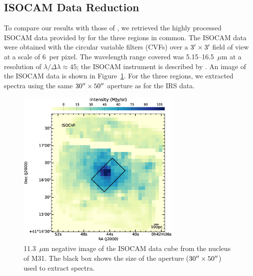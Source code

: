 \subsection{ISOCAM Data Reduction}
\label{sect:iso_data}

To compare our results with those of  \citet{1998Cesarsky}, we retrieved the highly processed ISOCAM data provided by \citet{Boulanger_F_2005}  
for the three regions in common. 
The ISOCAM data were obtained with the circular variable filters (CVFs) over a $3\hbox{$^\prime$} \times 3\hbox{$^\prime$}$ field of view at a scale of 6\arcsec\ per pixel. 
The wavelength range covered was 5.15--16.5~$\mu$m at a resolution of $\lambda/\Delta \lambda \approx 45$; the ISOCAM instrument is described by \citet{cesarsky1996}.
An image of the ISOCAM data is shown in Figure~\ref{isonuc}.  For the three regions, we extracted spectra using the same 
$30\hbox{$^{\prime\prime}$}\times50\hbox{$^{\prime\prime}$}$ aperture as for the IRS data. 

\begin{figure}
\centering
\includegraphics[width = 8cm]{./isonuc.eps}
\caption{11.3~$\mu$m negative image of the ISOCAM data cube from the nucleus of M31. The black box shows the size of the aperture ($30\hbox{$^{\prime\prime}$}\times50\hbox{$^{\prime\prime}$}$) used to extract spectra.}
\label{isonuc}
\end{figure}
